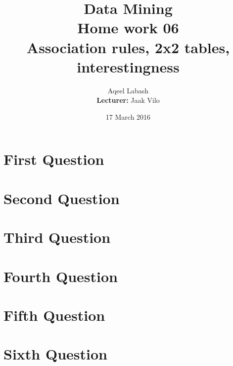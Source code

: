 \documentclass{article}
\title{Data Mining\\
		Home work 06\\Association rules, 2x2 tables, interestingness}
\author{Aqeel Labash\\ \textbf{Lecturer:} Jaak Vilo}
\date{17 March 2016}
\begin{document}
	\maketitle
	\section*{First Question}
	\section*{Second Question}
	\section*{Third Question}
	\section*{Fourth Question}
	\section*{Fifth Question}
	\section*{Sixth Question}
					
\end{document}
